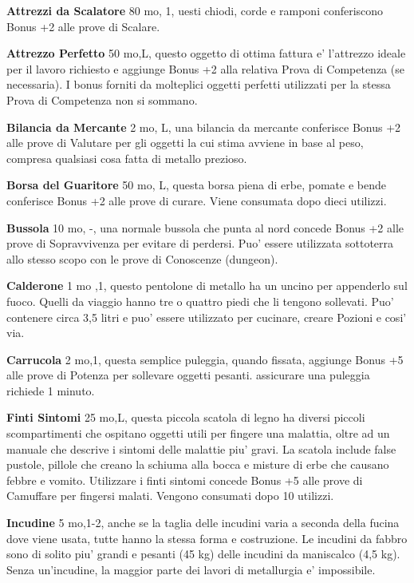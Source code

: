 \documentclass[a4paper,11pt,twoside,openany]{book}
\begin{document}
{		\textbf{Attrezzi da Scalatore} 80 mo, 1, uesti chiodi, corde e ramponi conferiscono Bonus +2 alle prove di Scalare.
		
		\textbf{Attrezzo Perfetto} 50 mo,L, questo oggetto di ottima fattura e' l'attrezzo ideale per il lavoro richiesto e aggiunge Bonus +2 alla relativa Prova di Competenza (se necessaria). I bonus forniti da molteplici oggetti perfetti utilizzati per la stessa Prova di Competenza non si sommano.
		
		\textbf{Bilancia da Mercante} 2 mo, L, una bilancia da mercante conferisce Bonus +2 alle prove di Valutare per gli oggetti la cui stima avviene in base al peso, compresa qualsiasi cosa fatta di metallo prezioso.
		
		\textbf{Borsa del Guaritore} 50 mo, L, questa borsa piena di erbe, pomate e bende conferisce Bonus +2 alle prove di curare. Viene consumata dopo dieci utilizzi.
		
		\textbf{Bussola} 10 mo, -, una normale bussola che punta al nord concede Bonus +2 alle prove di Sopravvivenza per evitare di perdersi. Puo' essere utilizzata sottoterra allo stesso scopo con le prove di Conoscenze (dungeon).
		
		\textbf{Calderone} 1 mo ,1, questo pentolone di metallo ha un uncino per appenderlo sul fuoco. Quelli da viaggio hanno tre o quattro piedi che li tengono sollevati. Puo' contenere circa 3,5 litri e puo' essere utilizzato per cucinare, creare Pozioni e cosi' via.
		
		\textbf{Carrucola} 2 mo,1, questa semplice puleggia, quando fissata, aggiunge Bonus +5 alle prove di Potenza per sollevare oggetti pesanti. assicurare una puleggia richiede 1 minuto.
		
		\textbf{Finti Sintomi} 25 mo,L, questa piccola scatola di legno ha diversi piccoli scompartimenti che ospitano oggetti utili per fingere una malattia, oltre ad un manuale che descrive i sintomi delle malattie piu' gravi. La scatola include false pustole, pillole che creano la schiuma alla bocca e misture di erbe che causano febbre e vomito. 
		Utilizzare i finti sintomi concede Bonus +5 alle prove di Camuffare per fingersi malati. Vengono consumati dopo 10 utilizzi.
		
		\textbf{Incudine} 5 mo,1-2, anche se la taglia delle incudini varia a seconda della fucina dove viene usata, tutte hanno la stessa forma e costruzione. Le incudini da fabbro sono di solito piu' grandi e pesanti (45 kg) delle incudini da maniscalco (4,5 kg). 
		Senza un'incudine, la maggior parte dei lavori di metallurgia e' impossibile.
		
}
\end{document}
